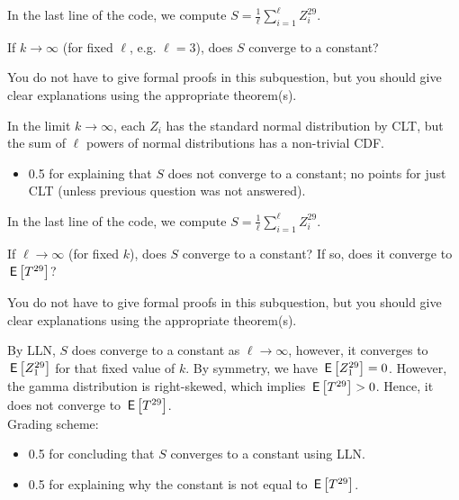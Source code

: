 \vspace*{20pt}



\begin{exercise}[0.5]
In the last line of the code, we compute $S = \frac1{\ell}\sum_{i=1}^{\ell} Z_i^{29}$.

 If $k \to \infty$ (for fixed $\ell$, e.g. $\ell=3$), does $S$ converge to a constant? 

You do not have to give formal proofs in this subquestion, but you should give clear explanations using the appropriate theorem(s). 
\begin{solution}
In the limit $k \to \infty$, each $Z_i$ has the standard normal distribution by CLT, but the sum of $\ell$ powers of normal distributions has a non-trivial CDF. \\
\begin{itemize}
\item 0.5 for explaining that $S$ does not converge to a constant; no points for just CLT (unless previous question was not answered).
\end{itemize}
\end{solution}
\end{exercise}



\vspace*{20pt}



\begin{exercise}[1]
In the last line of the code, we compute $S = \frac1{\ell}\sum_{i=1}^{\ell} Z_i^{29}$.

If $\ell \to \infty$ (for fixed $k$), does $S$ converge to a constant? 
If so, does it converge to $\,\mathsf{E}\left[T^{29}\right]$?

You do not have to give formal proofs in this subquestion, but you should give clear explanations using the appropriate theorem(s). 
\begin{solution}
By LLN, $S$ does converge to a constant as  $\ell \to \infty$, however, it converges to $\,\mathsf{E}\left[Z_1^{29}\right]$ for that fixed value of $k$. By symmetry, we have  $\,\mathsf{E}\left[Z_1^{29}\right] = 0$. However, the gamma distribution is right-skewed, which implies $\,\mathsf{E}\left[T^{29}\right] > 0$. Hence, it does not converge to $\,\mathsf{E}\left[T^{29}\right]$. \\
Grading scheme:
\begin{itemize}
\item 0.5 for concluding that $S$ converges to a constant using LLN.
\item 0.5 for explaining why the constant is not equal to $\,\mathsf{E}\left[T^{29}\right]$.
\end{itemize}
\end{solution}
\end{exercise}

